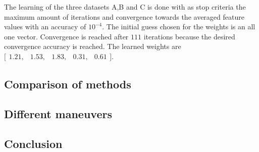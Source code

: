  The learning of the three datasets A,B and C is done with as stop criteria the maximum amount of iterations and convergence towards the averaged feature values with an accuracy of $10^{-4}$. The initial guess chosen for the weights is an all one vector. Convergence is reached after $111$ iterations because the desired convergence accuracy is reached. The learned weights are $\bigl[ \begin{smallmatrix} 1.21,&1.53,&1.83,&0.31,&0.61\end{smallmatrix}\bigr]$. 
 

 
 \subsection{Comparison of methods}
  
 \subsection{Different maneuvers}
 
 \subsection{Conclusion}





%

